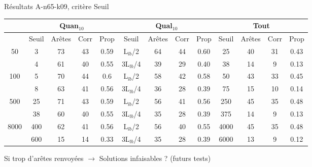 \documentclass{beamer}
\begin{document}
\begin{frame}{Résultats A-n65-k09, critère Seuil}

\begin{table}[H]

\begin{tabular}{|@{}c@{}|@{}c@{}|@{}c@{}|@{}c@{}|@{}c@{}||@{}c@{}|@{}c@{}|@{}c@{}|@{}c@{}||@{}c@{}|@{}c@{}|@{}c@{}|@{}c@{}|}

\hline
 & \multicolumn{4}{c|}{Quan$_{10}$} & \multicolumn{4}{c|}{Qual$_{10}$} & \multicolumn{4}{c|}{Tout} \\
 \hline
 & Seuil & Arêtes & Corr & Prop & Seuil & Arêtes & Corr & Prop & Seuil & Arêtes & Corr & Prop \\
 \hline
 50 & 3 & 73 & 43 & 0.59 & L$_{lb}$/2 & 64 & 44 & 0.60 & 25 & 40 & 31 & 0.43 \\
 \cline{2-13} 
    & 4 & 61 & 40 & 0.55 & 3L$_{lb}$/4 & 39 & 29 & 0.40 & 38 & 14 & 9 & 0.13 \\
  \hline
   100 & 5 & 70 & 44 & 0.6 & L$_{lb}$/2 & 58 & 42 & 0.58 & 50 & 43 & 33 & 0.45 \\
 \cline{2-13} 
    & 8 & 63 & 41 & 0.56 & 3L$_{lb}$/4 & 36 & 28 & 0.39 & 75 & 15 & 10 & 0.14 \\
  \hline
   500 & 25 & 71 & 43 & 0.59 & L$_{lb}$/2 & 56 & 41 & 0.56 & 250 & 45 & 35 & 0.48 \\
 \cline{2-13} 
    & 38 & 60 & 40 & 0.55 & 3L$_{lb}$/4 & 35 & 28 & 0.39 & 375 & 14 & 9 & 0.13 \\
  \hline
   8000 & 400 & 62 & 41 & 0.56 & L$_{lb}$/2 & 56 & 40 & 0.55 & 4000 & 45 & 35 & 0.48 \\
 \cline{2-13} 
    & 600 & 15 & 14 & 0.33 & 3L$_{lb}$/4 & 35 & 28 & 0.39 & 6000 & 13 & 9 & 0.12 \\
  \hline

\end{tabular}


\end{table}

Si trop d'arêtes renvoyées $\rightarrow$ Solutions infaisables ? (futurs tests)


\end{frame}
\end{document}
